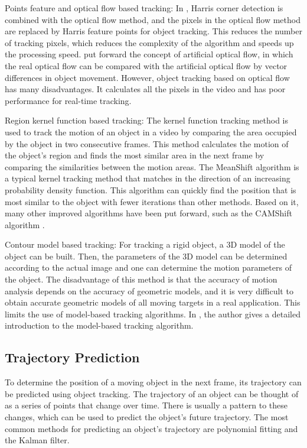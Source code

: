 \documentclass[12pt]{article}
\begin{document}
Points feature and optical flow based tracking: In \cite{4522480}, Harris corner detection is combined with the optical flow method, and the pixels in the optical flow method are replaced by Harris feature points for object tracking. This reduces the number of tracking pixels, which reduces the complexity of the algorithm and speeds up the processing speed. \cite{rodriguez2012real} put forward the concept of artificial optical flow, in which the real optical flow can be compared with the artificial optical flow by vector differences in object movement. However, object tracking based on optical flow has many disadvantages. It calculates all the pixels in the video and has poor performance for real-time tracking.

Region kernel function based tracking: The kernel function tracking method is used to track the motion of an object in a video by comparing the area occupied by the object in two consecutive frames. This method calculates the motion of the object's region and finds the most similar area in the next frame by comparing the similarities between the motion areas. The MeanShift algorithm \cite{comaniciu2002mean} is a typical kernel tracking method that matches in the direction of an increasing probability density function. This algorithm can quickly find the position that is most similar to the object with fewer iterations than other methods. Based on it, many other improved algorithms have been put forward, such as the CAMShift algorithm \cite{nouar2006improved}.

Contour model based tracking: For tracking a rigid object, a 3D model of the object can be built. Then, the parameters of the 3D model can be determined according to the actual image and one can determine the motion parameters of the object. The disadvantage of this method is that the accuracy of motion analysis depends on the accuracy of geometric models, and it is very difficult to obtain accurate geometric models of all moving targets in a real application. This limits the use of model-based tracking algorithms. In \cite{hu2004survey}, the author gives a detailed introduction to the model-based tracking algorithm.

\subsection*{Trajectory Prediction}
To determine the position of a moving object in the next frame, its trajectory can be predicted using object tracking. The trajectory of an object can be thought of as a series of points that change over time. There is usually a pattern to these changes, which can be used to predict the object's future trajectory. The most common methods for predicting an object's trajectory are polynomial fitting and the Kalman filter.
\end{document}
